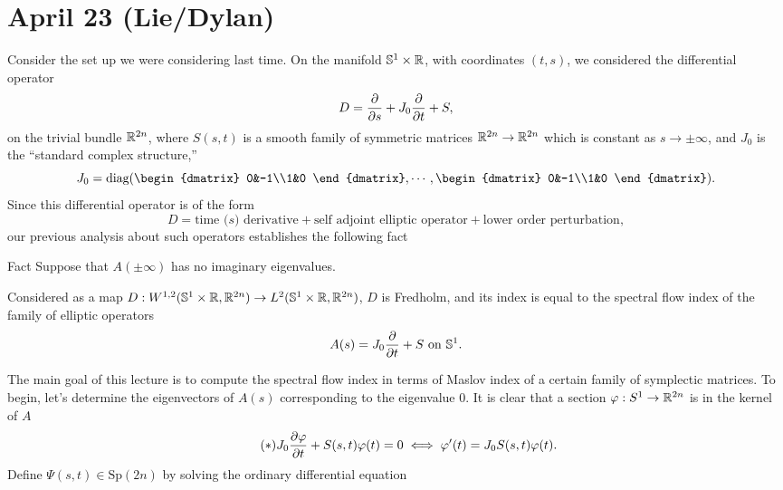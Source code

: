 \section*{\textbf{April 23 (Lie/Dylan)}}
Consider the set up we were considering last time. On the manifold
$\mathbb{S}^{1}\times \mathbb{R}$, with coordinates $(t,s)$, we considered the
differential operator $$D=\frac{\partial}{\partial s}+J_0\frac{\partial}{\partial t}+S,$$
on the trivial bundle $\mathbb{R}^{2n}$, where $S(s,t)$ is a smooth family of
symmetric matrices $\mathbb{R}^{2n}\to \mathbb{R}^{2n}$ which is constant as $s\to \pm \infty$, and $J_{0}$
is the ``standard complex structure,''
\begin{equation*}
  J_{0}=\text{diag}(
 \begin{dmatrix}
    0&-1\\1&0
  \end{dmatrix},\cdots, \begin{dmatrix}
    0&-1\\1&0
  \end{dmatrix}
).
\end{equation*}
Since this differential operator is of the form
\begin{equation*}
  D=\text{time ($s$) derivative}+\text{self adjoint elliptic operator}+\text{lower order perturbation},
\end{equation*}
our previous analysis about such operators establishes the following fact
\begin{clear}{Fact}
  Suppose that $A(\pm \infty)$ has no imaginary eigenvalues.
  
  Considered as a map $D:W^{1,2}(\mathbb{S}^{1}\times \mathbb{R},\mathbb{R}^{2n})\to
  L^{2}(\mathbb{S}^{1}\times \mathbb{R},\mathbb{R}^{2n})$, $D$ is Fredholm, and its index is
  equal to the spectral flow index of the family of elliptic operators
  \begin{equation*}
    A(s)=J_0\frac{\partial}{\partial t}+S\text{ on $\mathbb{S}^{1}$}.
  \end{equation*}
\end{clear}
The main goal of this lecture is to compute the spectral flow index in
terms of Maslov index of a certain family of symplectic matrices. To
begin, let's determine the eigenvectors of $A(s)$ corresponding to the
eigenvalue $0$. It is clear that a section $\varphi:S^1\to \mathbb{R}^{2n}$ is
in the kernel of $A$
\begin{equation*}\tag{$\ast$}
J_0\frac{\partial\varphi}{\partial t} +S(s,t)\varphi(t)=0\iff \varphi'(t)=J_0S(s,t)\varphi(t).
\end{equation*}
Define $\Psi(s,t)\in \text{Sp}(2n)$ by solving the ordinary
differential equation
